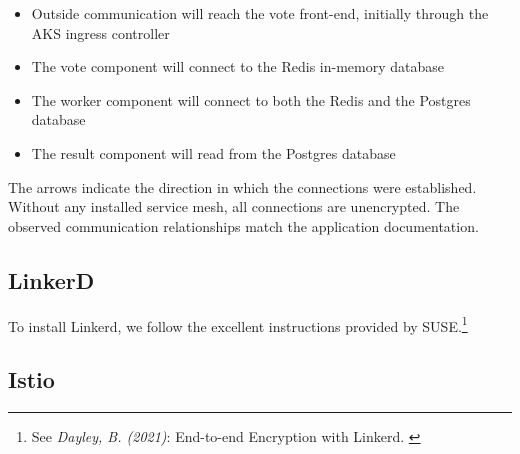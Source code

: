 \begin{itemize}
    \item Outside communication will reach the vote front-end, initially through the AKS ingress controller
    \item The vote component will connect to the Redis in-memory database
    \item The worker component will connect to both the Redis and the Postgres database
    \item The result component will read from the Postgres database
\end{itemize}

The arrows indicate the direction in which the connections were established. Without any installed service mesh, all connections are unencrypted. The observed communication relationships match the application documentation.

\subsection{LinkerD}

To install Linkerd, we follow the excellent instructions provided by SUSE.\footnote{See \textit{Dayley, B. (2021)}: End-to-end Encryption with Linkerd. \cite{installLinkerd}}

\subsection{Istio}

